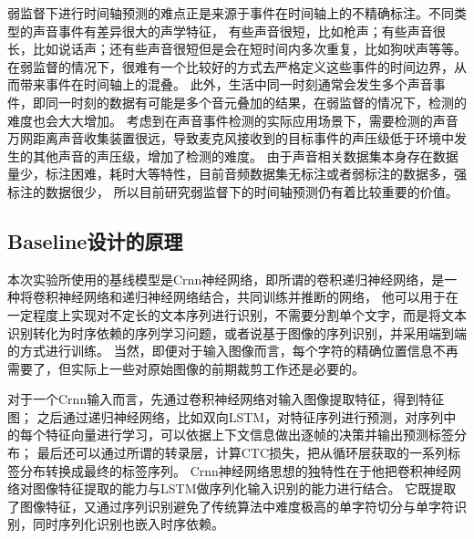 \documentclass[]{ctexart}
\begin{document}
弱监督下进行时间轴预测的难点正是来源于事件在时间轴上的不精确标注。不同类型的声音事件有差异很大的声学特征，
有些声音很短，比如枪声；有些声音很长，比如说话声；还有些声音很短但是会在短时间内多次重复，比如狗吠声等等。
在弱监督的情况下，很难有一个比较好的方式去严格定义这些事件的时间边界，从而带来事件在时间轴上的混叠。
此外，生活中同一时刻通常会发生多个声音事件，即同一时刻的数据有可能是多个音元叠加的结果，在弱监督的情况下，检测的难度也会大大增加。
考虑到在声音事件检测的实际应用场景下，需要检测的声音万网距离声音收集装置很远，导致麦克风接收到的目标事件的声压级低于环境中发生的其他声音的声压级，增加了检测的难度。
由于声音相关数据集本身存在数据量少，标注困难，耗时大等特性，目前音频数据集无标注或者弱标注的数据多，强标注的数据很少，
所以目前研究弱监督下的时间轴预测仍有着比较重要的价值。

\subsection{Baseline设计的原理}
本次实验所使用的基线模型是Crnn神经网络，即所谓的卷积递归神经网络，是一种将卷积神经网络和递归神经网络结合，共同训练并推断的网络，
他可以用于在一定程度上实现对不定长的文本序列进行识别，不需要分割单个文字，而是将文本识别转化为时序依赖的序列学习问题，或者说基于图像的序列识别，并采用端到端的方式进行训练。
当然，即便对于输入图像而言，每个字符的精确位置信息不再需要了，但实际上一些对原始图像的前期裁剪工作还是必要的。

对于一个Crnn输入而言，先通过卷积神经网络对输入图像提取特征，得到特征图；
之后通过递归神经网络，比如双向LSTM，对特征序列进行预测，对序列中的每个特征向量进行学习，可以依据上下文信息做出逐帧的决策并输出预测标签分布；
最后还可以通过所谓的转录层，计算CTC损失，把从循环层获取的一系列标签分布转换成最终的标签序列。
Crnn神经网络思想的独特性在于他把卷积神经网络对图像特征提取的能力与LSTM做序列化输入识别的能力进行结合。
它既提取了图像特征，又通过序列识别避免了传统算法中难度极高的单字符切分与单字符识别，同时序列化识别也嵌入时序依赖。
\end{document}
